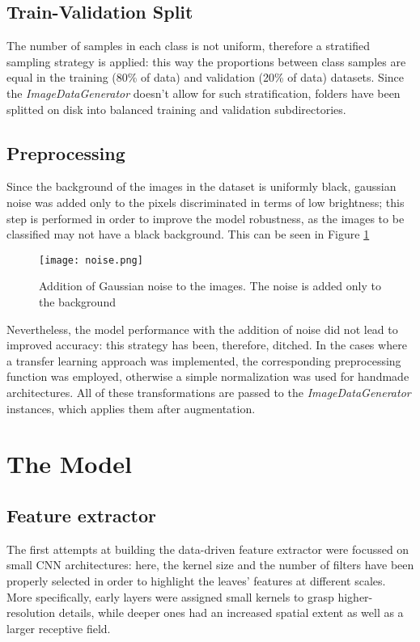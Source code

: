 \documentclass[conference]{IEEEtran}
\begin{document}
\subsection{Train-Validation Split}
    The number of samples in each class is not uniform, therefore a stratified
    sampling strategy is
    applied: this way the proportions between class samples are equal in the
    training (80\% of data) and validation (20\% of data) datasets. Since the
    \textit{ImageDataGenerator} doesn't allow for such stratification, folders
    have been splitted on disk into balanced training and validation subdirectories. 
\subsection{Preprocessing}
    Since the background of the images in the dataset is
    uniformly black, gaussian noise was added only to the pixels discriminated
    in terms of low brightness; this step is performed in order to improve the
    model robustness, as the images to be classified
    may not have a black background. This can be seen in Figure \ref{fig:noise}
    \begin{figure}[]
        \texttt{[image: noise.png]}
        \caption{Addition of Gaussian noise to the images. The noise is added
        only to the background}
        \label{fig:noise}
    \end{figure}
    Nevertheless, the model performance with the addition of noise did not lead
    to improved accuracy: this strategy has been, therefore, ditched.
    In the cases where a transfer learning approach was implemented, the
    corresponding preprocessing function was employed, otherwise a simple
    normalization was used for handmade architectures.
    All of these transformations are passed to the
    \textit{ImageDataGenerator} instances, which applies them after augmentation.

\section{The Model}
\subsection{Feature extractor}
The first attempts at building the data-driven feature extractor were focussed
on small CNN architectures: here, the kernel size and the number of filters have
been properly selected in order to highlight the leaves' features at different
scales. More specifically, early layers were assigned small kernels to grasp
higher-resolution details, while deeper ones had an increased spatial extent as well
as a larger receptive field. 
\end{document}
